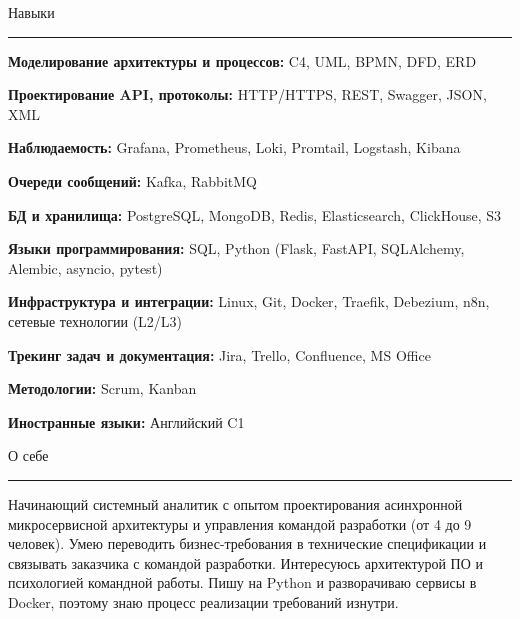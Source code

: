 \documentclass[14pt, a4paper, oneside]{extarticle}
\begin{document}
\begin{flushleft}
	\vspace{-\intextsep}
	\large Навыки
\end{flushleft}

\vspace{-0.8\intextsep}
\hrule


\vspace{0.5\intextsep}

\textbf{Моделирование архитектуры и процессов:} C4, UML, BPMN, DFD, ERD

\textbf{Проектирование API, протоколы:} HTTP/HTTPS, REST, Swagger, JSON, XML

\textbf{Наблюдаемость:} Grafana, Prometheus, Loki, Promtail, Logstash, Kibana

\textbf{Очереди сообщений:} Kafka, RabbitMQ

\textbf{БД и хранилища:} PostgreSQL, MongoDB, Redis, Elasticsearch, ClickHouse, S3

\textbf{Языки программирования:} SQL, Python (Flask, FastAPI, SQLAlchemy, Alembic, asyncio, pytest)

\textbf{Инфраструктура и интеграции:} Linux, Git, Docker, Traefik, Debezium, n8n, сетевые технологии (L2/L3)

\textbf{Трекинг задач и документация:} Jira, Trello, Confluence, MS Office

\textbf{Методологии:} Scrum, Kanban 

\textbf{Иностранные языки:} Английский C1


\begin{flushleft}
	\vspace{-\intextsep}
	\large О себе
\end{flushleft}

\vspace{-0.8\intextsep}
\hrule

\begin{sloppypar}
	\vspace{0.5\intextsep}
	\quad
	Начинающий системный аналитик с опытом проектирования асинхронной микросервисной архитектуры и управления командой разработки (от 4 до 9 человек). Умею переводить бизнес-требования в технические спецификации и связывать заказчика с командой разработки. Интересуюсь архитектурой ПО и психологией командной работы. Пишу на Python и разворачиваю сервисы в Docker, поэтому знаю процесс реализации требований изнутри. 
\end{sloppypar}
\end{document}
